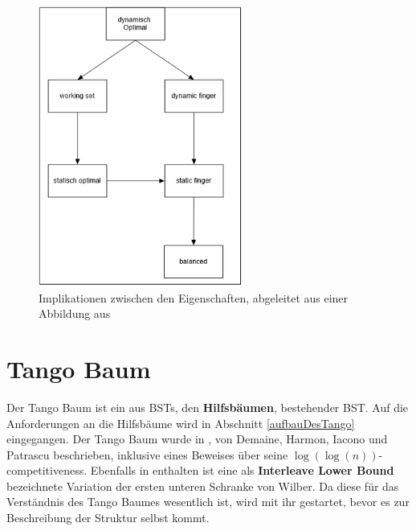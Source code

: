 \documentclass[a4paper,12pt]{article}
\begin{document}
\begin{figure}[H]
	\centering
	\includegraphics[width= 0.6\textwidth]{"Medien/DynOpt/upperBounds"}
	\caption{Implikationen zwischen den Eigenschaften, abgeleitet aus einer Abbildung aus \cite{upperBounds} }
	\label{fig:upperBounds}
\end{figure}


\section{Tango Baum} \label{TangoAbschnitt}
Der Tango Baum ist ein aus BSTs, den \textbf{Hilfsbäumen}, bestehender BST. Auf die Anforderungen an die Hilfsbäume wird in Abschnitt \ref{aufbauDesTango} eingegangen. Der Tango Baum wurde in \cite{demainDinamicOpti}, von Demaine, Harmon, Iacono und Patrascu beschrieben, inklusive eines Beweises über seine $\log\left(\log\left(n\right)\right)$-competitiveness. Ebenfalls in \cite{demainDinamicOpti} enthalten ist eine als \textbf{Interleave Lower Bound} bezeichnete Variation der ersten unteren Schranke von Wilber. Da diese für das Verständnis des Tango Baumes wesentlich ist, wird mit ihr gestartet, bevor es zur Beschreibung der Struktur selbst kommt. 
\end{document}
